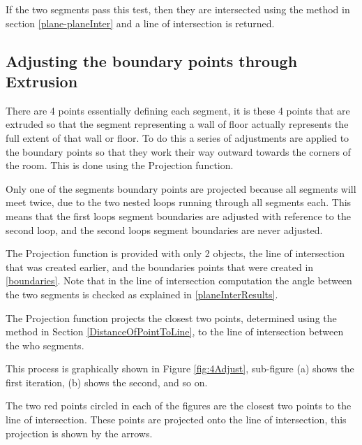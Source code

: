 			If the two segments pass this test, then they are intersected using the method in section \ref{plane-planeInter} and a line of intersection is returned.
			
		\subsection{Adjusting the boundary points through\\ Extrusion}
		\label{Extrusion}
			There are 4 points essentially defining each segment, it is these 4 points that are extruded so that the segment representing a wall of floor actually represents the full extent of that wall or floor. To do this a series of adjustments are applied to the boundary points so that they work their way outward towards the corners of the room. This is done using the Projection function.
			
			Only one of the segments boundary points are projected because all segments will meet twice, due to the two nested loops running through all segments each. This means that the first loops segment boundaries are adjusted with reference to the second loop, and the second loops segment boundaries are never adjusted.
			
			The Projection function is provided with only 2 objects, the line of intersection that was created earlier, and the boundaries points that were created in \ref{boundaries}. Note that in the line of intersection computation the angle between the two segments is checked as explained in \ref{planeInterResults}.
			
			The Projection function projects the closest two points, determined using the method in Section \ref{DistanceOfPointToLine}, to the line of intersection between the who segments.
			
			This process is graphically shown in Figure \ref{fig:4Adjust},  sub-figure (a) shows the first iteration, (b) shows the second, and so on.
			
			The two red points circled in each of the figures are the closest two points to the line of intersection. These points are projected onto the line of intersection, this projection is shown by the arrows.
			
